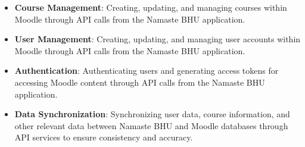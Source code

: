 \begin{itemize}
    \item \textbf{Course Management}: Creating, updating, and managing courses within Moodle through API calls from the Namaste BHU application.
    \item \textbf{User Management}: Creating, updating, and managing user accounts within Moodle through API calls from the Namaste BHU application.
    \item \textbf{Authentication}: Authenticating users and generating access tokens for accessing Moodle content through API calls from the Namaste BHU application.
    \item \textbf{Data Synchronization}: Synchronizing user data, course information, and other relevant data between Namaste BHU and Moodle databases through API services to ensure consistency and accuracy.
\end{itemize}

